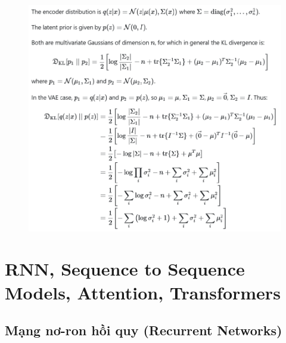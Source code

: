 \documentclass{book}
\begin{document}
\begin{figure}[H]
    \centering
    \includegraphics[width=0.75\linewidth]{images/VAE_17.png}
\end{figure}

\chapter{RNN, Sequence to Sequence Models, Attention, Transformers}
\section{Mạng nơ-ron hồi quy (Recurrent Networks)}
\end{document}
